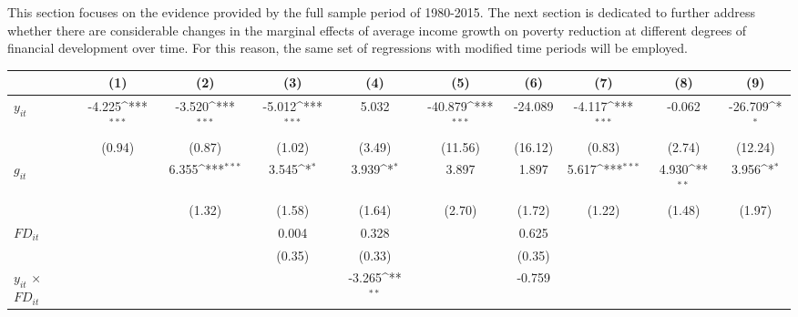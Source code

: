 \documentclass[12pt, a4paper]{article}
\begin{document}
This section focuses on the evidence provided by the full sample period of 1980-2015. The next section is dedicated to further address whether there are considerable changes in the marginal effects of average income growth on poverty reduction at different degrees of financial development over time. For this reason, the same set of regressions with modified time periods will be employed.

	\begin{table}[htbp]
	\centering
	\scriptsize
	\setlength\tabcolsep{1pt}	
	\begin{threeparttable}
		{
			\def\sym#1{\ifmmode^{#1}\else\(^{#1}\)\fi}
			\begin{tabular}{l*{9}{c}}
				\hline\hline
				&\multicolumn{1}{c}{(1)}&\multicolumn{1}{c}{(2)}&\multicolumn{1}{c}{(3)}&\multicolumn{1}{c}{(4)}&\multicolumn{1}{c}{(5)}&\multicolumn{1}{c}{(6)}&\multicolumn{1}{c}{(7)}&\multicolumn{1}{c}{(8)}&\multicolumn{1}{c}{(9)}\\
				\hline
				$y_{it}$              &      -4.225\sym{***}&      -3.520\sym{***}&      -5.012\sym{***}&       5.032         &     -40.879\sym{***}&     -24.089         &      -4.117\sym{***}&      -0.062         &     -26.709\sym{*}  \\
				&      (0.94)         &      (0.87)         &      (1.02)         &      (3.49)         &     (11.56)         &     (16.12)         &      (0.83)         &      (2.74)         &     (12.24)         \\
				$g_{it}$            &                     &       6.355\sym{***}&       3.545\sym{*}  &       3.939\sym{*}  &       3.897         &       1.897         &       5.617\sym{***}&       4.930\sym{**} &       3.956\sym{*}  \\
				&                     &      (1.32)         &      (1.58)         &      (1.64)         &      (2.70)         &      (1.72)         &      (1.22)         &      (1.48)         &      (1.97)         \\
				$FD_{it}$               &                     &                     &       0.004         &       0.328         &                     &       0.625         &                     &                     &                     \\
				&                     &                     &      (0.35)         &      (0.33)         &                     &      (0.35)         &                     &                     &                     \\
				$y_{it}$ $\times$ $FD_{it}$ &                     &                     &                     &      -3.265\sym{**} &                     &      -0.759         &                     &                     &                     \\

\end{tabular}}
\end{threeparttable}
\end{table}
\end{document}
